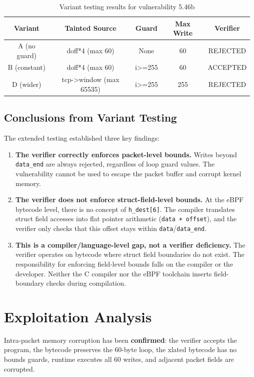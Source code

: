 \begin{table}[h]
\centering
\begin{tabular}{|c|c|c|c|c|}
\hline
\textbf{Variant} & \textbf{Tainted Source} & \textbf{Guard} & \textbf{Max Write} & \textbf{Verifier} \\
\hline
A (no guard) & doff*4 (max 60) & None & 60 & REJECTED \\
B (constant) & doff*4 (max 60) & i>=255 & 60 & ACCEPTED \\
D (wider) & tcp->window (max 65535) & i>=255 & 255 & REJECTED \\
\hline
\end{tabular}
\caption{Variant testing results for vulnerability 5.46b}
\end{table}

\subsection{Conclusions from Variant Testing}

\noindent
The extended testing established three key findings:

\begin{enumerate}[label=\arabic*.]
  \item \textbf{The verifier correctly enforces packet-level bounds.} Writes beyond \texttt{data\_end} are always rejected, regardless of loop guard values. The vulnerability cannot be used to escape the packet buffer and corrupt kernel memory.
  \item \textbf{The verifier does not enforce struct-field-level bounds.} At the eBPF bytecode level, there is no concept of \texttt{h\_dest[6]}. The compiler translates struct field accesses into flat pointer arithmetic (\texttt{data + offset}), and the verifier only checks that this offset stays within \texttt{data}/\texttt{data\_end}.
  \item \textbf{This is a compiler/language-level gap, not a verifier deficiency.} The verifier operates on bytecode where struct field boundaries do not exist. The responsibility for enforcing field-level bounds falls on the compiler or the developer. Neither the C compiler nor the eBPF toolchain inserts field-boundary checks during compilation.
\end{enumerate}

\section{Exploitation Analysis}
\noindent
Intra-packet memory corruption has been \textbf{confirmed}: the verifier accepts the program, the bytecode preserves the 60-byte loop, the xlated bytecode has no bounds guards, runtime executes all 60 writes, and adjacent packet fields are corrupted.

